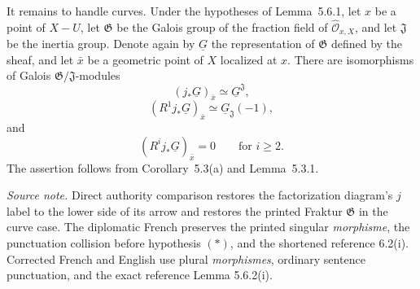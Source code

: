 It remains to handle curves.  Under the hypotheses of Lemma~5.6.1, let $x$
be a point of $X-U$, let $\mathfrak G$ be the Galois group of the fraction
field of $\widehat{\mathcal O}_{x,X}$, and let $\mathfrak J$ be the inertia
group.  Denote again by $\underline G$ the representation of $\mathfrak G$
defined by the sheaf, and let $\bar x$ be a geometric point of $X$ localized
at $x$.  There are isomorphisms of Galois
$\mathfrak G/\mathfrak J$-modules
\[
(j_*\underline G)_{\bar x}\simeq\underline G^{\mathfrak J},
\]
\[
(R^1j_*\underline G)_{\bar x}\simeq\underline G_{\mathfrak J}(-1),
\]
and
\[
(R^ij_*\underline G)_{\bar x}=0\qquad\text{for }i\geq2.
\]
The assertion follows from Corollary~5.3(a) and Lemma~5.3.1.

\medskip
\noindent\emph{Source note.}
Direct authority comparison restores the factorization diagram's $j$ label
to the lower side of its arrow and restores the printed Fraktur
$\mathfrak G$ in the curve case.  The diplomatic French preserves the
printed singular \emph{morphisme}, the punctuation collision before
hypothesis $(*)$, and the shortened reference 6.2(i).  Corrected French and
English use plural \emph{morphismes}, ordinary sentence punctuation, and the
exact reference Lemma 5.6.2(i).
